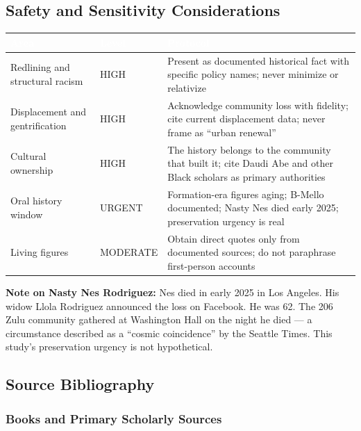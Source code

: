 \documentclass[11pt,letterpaper]{article}
\newcommand{\tableheader}[1]{\textbf{\sffamily\textcolor{white}{#1}}}
\begin{document}
\subsection{Safety and Sensitivity Considerations}

\begin{center}
\begin{tabularx}{\textwidth}{L{3.5cm}L{2.5cm}X}
\toprule
{}
\tableheader{Area} & \tableheader{Level} & \tableheader{Protocol} \\
\midrule
Redlining and structural racism & HIGH & Present as documented historical fact with specific policy names; never minimize or relativize \\
Displacement and gentrification & HIGH & Acknowledge community loss with fidelity; cite current displacement data; never frame as ``urban renewal'' \\
Cultural ownership & HIGH & The history belongs to the community that built it; cite Daudi Abe and other Black scholars as primary authorities \\
Oral history window & URGENT & Formation-era figures aging; B-Mello documented; Nasty Nes died early 2025; preservation urgency is real \\
Living figures & MODERATE & Obtain direct quotes only from documented sources; do not paraphrase first-person accounts \\
\bottomrule
\end{tabularx}
\end{center}

\begin{goldbox}
\textbf{\sffamily Note on Nasty Nes Rodriguez:} Nes died in early 2025 in Los Angeles. His widow Llola Rodriguez announced the loss on Facebook. He was 62. The 206 Zulu community gathered at Washington Hall on the night he died --- a circumstance described as a ``cosmic coincidence'' by the Seattle Times. This study's preservation urgency is not hypothetical.
\end{goldbox}

\subsection{Source Bibliography}

\subsubsection{Books and Primary Scholarly Sources}
\end{document}
